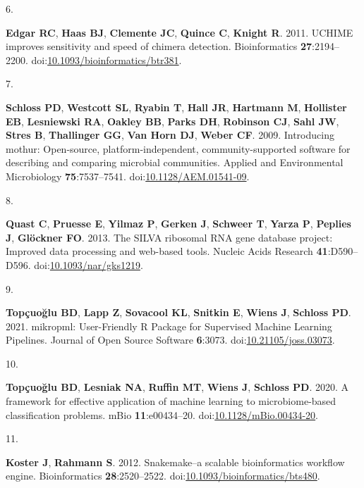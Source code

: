 \documentclass[
]{article}
\newlength{\cslhangindent}
\newlength{\csllabelwidth}
\newlength{\cslentryspacingunit} %
\newenvironment{CSLReferences}[2] %
 {%
  \setlength{\parindent}{0pt}
  \ifodd #1
  \let\oldpar\par
  \def\par{\hangindent=\cslhangindent\oldpar}
  \fi
  \setlength{\parskip}{#2\cslentryspacingunit}
 }%
 {}
\newcommand{\CSLLeftMargin}[1]{\parbox[t]{\csllabelwidth}{#1}}
\newcommand{\CSLRightInline}[1]{\parbox[t]{\linewidth - \csllabelwidth}{#1}\break}
\begin{document}
\begin{CSLReferences}{0}{1}
\leavevmode{}%
\CSLLeftMargin{6. }
\CSLRightInline{\textbf{Edgar RC}, \textbf{Haas BJ}, \textbf{Clemente
JC}, \textbf{Quince C}, \textbf{Knight R}. 2011. UCHIME improves
sensitivity and speed of chimera detection. Bioinformatics
\textbf{27}:2194--2200.
doi:\href{https://doi.org/10.1093/bioinformatics/btr381}{10.1093/bioinformatics/btr381}.}

\leavevmode{}%
\CSLLeftMargin{7. }
\CSLRightInline{\textbf{Schloss PD}, \textbf{Westcott SL},
\textbf{Ryabin T}, \textbf{Hall JR}, \textbf{Hartmann M},
\textbf{Hollister EB}, \textbf{Lesniewski RA}, \textbf{Oakley BB},
\textbf{Parks DH}, \textbf{Robinson CJ}, \textbf{Sahl JW}, \textbf{Stres
B}, \textbf{Thallinger GG}, \textbf{Van Horn DJ}, \textbf{Weber CF}.
2009. Introducing mothur: Open-source, platform-independent,
community-supported software for describing and comparing microbial
communities. Applied and Environmental Microbiology
\textbf{75}:7537--7541.
doi:\href{https://doi.org/10.1128/AEM.01541-09}{10.1128/AEM.01541-09}.}

\leavevmode{}%
\CSLLeftMargin{8. }
\CSLRightInline{\textbf{Quast C}, \textbf{Pruesse E}, \textbf{Yilmaz P},
\textbf{Gerken J}, \textbf{Schweer T}, \textbf{Yarza P}, \textbf{Peplies
J}, \textbf{Glöckner FO}. 2013. The SILVA ribosomal RNA gene database
project: Improved data processing and web-based tools. Nucleic Acids
Research \textbf{41}:D590--D596.
doi:\href{https://doi.org/10.1093/nar/gks1219}{10.1093/nar/gks1219}.}

\leavevmode{}%
\CSLLeftMargin{9. }
\CSLRightInline{\textbf{Topçuoğlu BD}, \textbf{Lapp Z}, \textbf{Sovacool
KL}, \textbf{Snitkin E}, \textbf{Wiens J}, \textbf{Schloss PD}. 2021.
mikropml: User-Friendly R Package for Supervised Machine Learning
Pipelines. Journal of Open Source Software \textbf{6}:3073.
doi:\href{https://doi.org/10.21105/joss.03073}{10.21105/joss.03073}.}

\leavevmode{}%
\CSLLeftMargin{10. }
\CSLRightInline{\textbf{Topçuoğlu BD}, \textbf{Lesniak NA},
\textbf{Ruffin MT}, \textbf{Wiens J}, \textbf{Schloss PD}. 2020. A
framework for effective application of machine learning to
microbiome-based classification problems. mBio \textbf{11}:e00434--20.
doi:\href{https://doi.org/10.1128/mBio.00434-20}{10.1128/mBio.00434-20}.}

\leavevmode{}%
\CSLLeftMargin{11. }
\CSLRightInline{\textbf{Koster J}, \textbf{Rahmann S}. 2012.
Snakemake--a scalable bioinformatics workflow engine. Bioinformatics
\textbf{28}:2520--2522.
doi:\href{https://doi.org/10.1093/bioinformatics/bts480}{10.1093/bioinformatics/bts480}.}


\end{CSLReferences}
\end{document}
